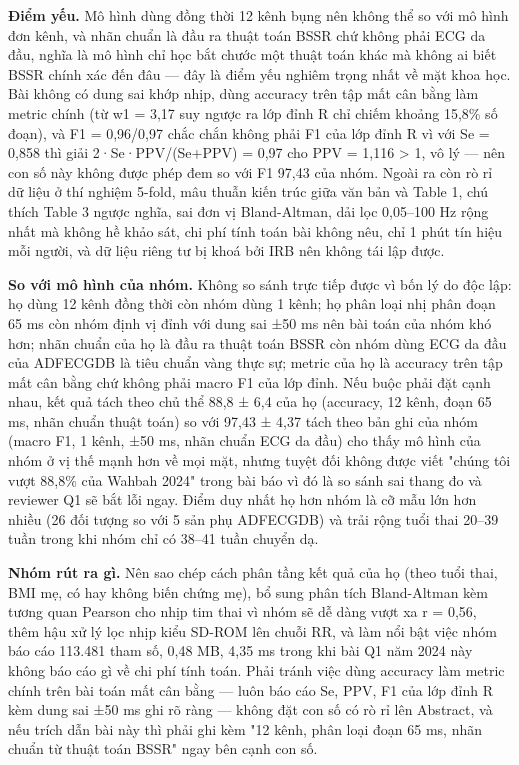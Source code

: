 \documentclass[12pt,a4paper]{article}
\begin{document}
\noindent \textbf{Điểm yếu.} Mô hình dùng đồng thời 12 kênh bụng nên không thể so với mô hình đơn kênh, và nhãn chuẩn là đầu ra thuật toán BSSR chứ không phải ECG da đầu, nghĩa là mô hình chỉ học bắt chước một thuật toán khác mà không ai biết BSSR chính xác đến đâu — đây là điểm yếu nghiêm trọng nhất về mặt khoa học. Bài không có dung sai khớp nhịp, dùng accuracy trên tập mất cân bằng làm metric chính (từ w1 = 3,17 suy ngược ra lớp đỉnh R chỉ chiếm khoảng 15,8\% số đoạn), và F1 = 0,96/0,97 chắc chắn không phải F1 của lớp đỉnh R vì với Se = 0,858 thì giải 2·Se·PPV/(Se+PPV) = 0,97 cho PPV = 1,116 > 1, vô lý — nên con số này không được phép đem so với F1 97,43 của nhóm. Ngoài ra còn rò rỉ dữ liệu ở thí nghiệm 5-fold, mâu thuẫn kiến trúc giữa văn bản và Table 1, chú thích Table 3 ngược nghĩa, sai đơn vị Bland-Altman, dải lọc 0,05–100 Hz rộng nhất mà không hề khảo sát, chi phí tính toán bài không nêu, chỉ 1 phút tín hiệu mỗi người, và dữ liệu riêng tư bị khoá bởi IRB nên không tái lập được.\par\vspace{3pt}
\noindent \textbf{\color{tdtblue}So với mô hình của nhóm.} Không so sánh trực tiếp được vì bốn lý do độc lập: họ dùng 12 kênh đồng thời còn nhóm dùng 1 kênh; họ phân loại nhị phân đoạn 65 ms còn nhóm định vị đỉnh với dung sai ±50 ms nên bài toán của nhóm khó hơn; nhãn chuẩn của họ là đầu ra thuật toán BSSR còn nhóm dùng ECG da đầu của ADFECGDB là tiêu chuẩn vàng thực sự; metric của họ là accuracy trên tập mất cân bằng chứ không phải macro F1 của lớp đỉnh. Nếu buộc phải đặt cạnh nhau, kết quả tách theo chủ thể 88,8 ± 6,4 của họ (accuracy, 12 kênh, đoạn 65 ms, nhãn chuẩn thuật toán) so với 97,43 ± 4,37 tách theo bản ghi của nhóm (macro F1, 1 kênh, ±50 ms, nhãn chuẩn ECG da đầu) cho thấy mô hình của nhóm ở vị thế mạnh hơn về mọi mặt, nhưng tuyệt đối không được viết "chúng tôi vượt 88,8\% của Wahbah 2024" trong bài báo vì đó là so sánh sai thang đo và reviewer Q1 sẽ bắt lỗi ngay. Điểm duy nhất họ hơn nhóm là cỡ mẫu lớn hơn nhiều (26 đối tượng so với 5 sản phụ ADFECGDB) và trải rộng tuổi thai 20–39 tuần trong khi nhóm chỉ có 38–41 tuần chuyển dạ.\par\vspace{3pt}
\noindent \textbf{\color{tdtblue}Nhóm rút ra gì.} Nên sao chép cách phân tầng kết quả của họ (theo tuổi thai, BMI mẹ, có hay không biến chứng mẹ), bổ sung phân tích Bland-Altman kèm tương quan Pearson cho nhịp tim thai vì nhóm sẽ dễ dàng vượt xa r = 0,56, thêm hậu xử lý lọc nhịp kiểu SD-ROM lên chuỗi RR, và làm nổi bật việc nhóm báo cáo 113.481 tham số, 0,48 MB, 4,35 ms trong khi bài Q1 năm 2024 này không báo cáo gì về chi phí tính toán. Phải tránh việc dùng accuracy làm metric chính trên bài toán mất cân bằng — luôn báo cáo Se, PPV, F1 của lớp đỉnh R kèm dung sai ±50 ms ghi rõ ràng — không đặt con số có rò rỉ lên Abstract, và nếu trích dẫn bài này thì phải ghi kèm "12 kênh, phân loại đoạn 65 ms, nhãn chuẩn từ thuật toán BSSR" ngay bên cạnh con số.\par\vspace{3pt}
\vspace{6pt}
\clearpage
\end{document}
